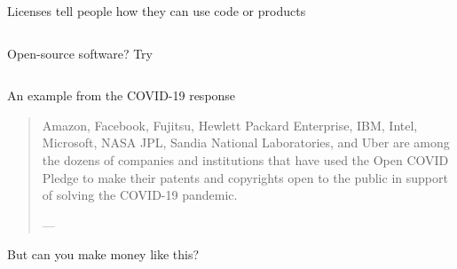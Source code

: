 \begin{frame}{Licenses tell people how they can use code or products}
\begin{columns}[c]
\begin{column}{0.45\textwidth}
\begin{block}{Open-source software?}
        Try 
        \end{block}
    \end{column}
\end{columns}

\vfill


\vfill


\end{frame}


\begin{frame}{An example from the COVID-19 response}

\vfill

\begin{quotation}
Amazon, Facebook, Fujitsu, Hewlett Packard Enterprise, IBM, Intel, Microsoft, NASA JPL, Sandia National Laboratories, and Uber are among the dozens of companies and institutions that have used the Open COVID Pledge to make their patents and copyrights open to the public in support of solving the COVID-19 pandemic.
\begin{flushright}
    \tiny{---}
  \end{flushright}
\end{quotation}

\vfill

But can you make money like this?

\end{frame}

